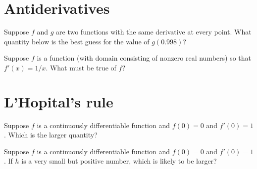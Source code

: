 \documentclass{ximera}
\begin{document}
\clearpage

\section{Antiderivatives}

\begin{problem}
  Suppose $f$ and $g$ are two functions with the same derivative at every point.  What quantity below is the best guess for the value of $g(0.998)$?
  \begin{multipleChoice}
  \end{multipleChoice}
\end{problem}

\begin{problem}
  Suppose $f$ is a function (with domain consisting of nonzero real numbers) so that $f'(x) = 1/x$.  What must be true of $f$?
  \begin{multipleChoice}
  \end{multipleChoice}
\end{problem}

\clearpage

\section{L'Hopital's rule}

\begin{problem}
  Suppose $f$ is a continuously differentiable function and $f(0) = 0$ and $f'(0) = 1$.  Which is the larger quantity?
  \begin{multipleChoice}
  \end{multipleChoice}
\end{problem}

\begin{problem}
  Suppose $f$ is a continuously differentiable function and $f(0) = 0$ and $f'(0) = 1$. If $h$ is a very small but positive number, which is likely to be larger?
  \begin{multipleChoice}
  \end{multipleChoice}
\end{problem}
\end{document}
